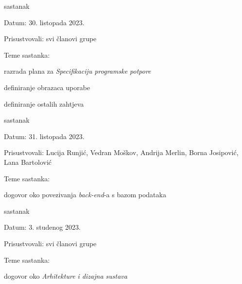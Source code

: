 \begin{packed_enum}
			\item sastanak
			
			\item[] \begin{packed_item}
				\item Datum: 30. listopada 2023.
				\item Prisustvovali: svi članovi grupe
				\item Teme sastanka:
				\begin{packed_item}
					\item razrada plana za \textit{Specifikaciju programske potpore}
					\item definiranje obrazaca uporabe
					\item definiranje ostalih zahtjeva
				\end{packed_item}
			\end{packed_item}
			
			\pagebreak
			
			\item sastanak
			
			\item[] \begin{packed_item}
				\item Datum: 31. listopada 2023.
				\item Prisustvovali: Lucija Runjić, Vedran Moškov, Andrija Merlin, Borna Josipović, Lana Bartolović
				\item Teme sastanka:
				\begin{packed_item}
					\item dogovor oko povezivanja \textit{back-end}-a s bazom podataka
				\end{packed_item}
			\end{packed_item}
			
			\item sastanak
			
			\item[] \begin{packed_item}
				\item Datum: 3. studenog 2023.
				\item Prisustvovali: svi članovi grupe
				\item Teme sastanka:
				\begin{packed_item}
					\item dogovor oko \textit{Arhitekture i dizajna sustava}
				\end{packed_item}
			\end{packed_item}
			

\end{packed_enum}
